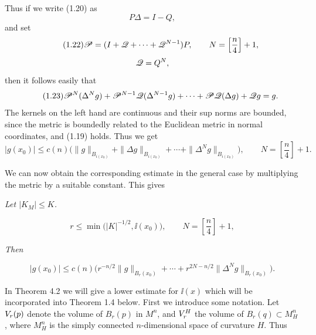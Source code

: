 Thus if we write (1.20) as
\begin{equation}\tag{1.21}
 P\Delta = I - Q,
\end{equation}
and set
\begin{equation}\tag{1.22}
 \mathscr{P} = (I + \mathscr{Q} + \cdots + \mathscr{Q}^{N-1})P,\qquad
 N=\left[\frac{n}{4}\right]+1,
\end{equation}
\[
\mathscr{Q} = Q^N,
\]
then it follows easily that
\begin{equation}\tag{1.23}
 \mathscr{P}^N(\Delta^N g) + \mathscr{P}^{N-1}\mathscr{Q}(\Delta^{N-1}g) + \cdots + \mathscr{P}\mathscr{Q}(\Delta g) + \mathscr{Q} g = g.
\end{equation}
The kernels on the left hand are continuous and their sup norms are bounded,
since the metric is boundedly related to the Euclidean metric in normal
coordinates, and (1.19) holds. Thus we get
\begin{equation}\tag{1.24}
|g(x_0)| \leq c(n)\bigl(\|g\|_{B_{i(x_0)}} + \|\Delta g\|_{B_{i(x_0)}} + \cdots + \|\Delta^N g\|_{B_{i(x_0)}}\bigr),
\qquad
N=\left[\frac{n}{4}\right]+1.
\end{equation}

We can now obtain the corresponding estimate in the general case by
multiplying the metric by a suitable constant. This gives

\begin{proposition}
\label{prop:local-elliptic-estimate}
\textit{Let $\lvert K_M\rvert \leq K$.}

\begin{equation}\tag{1.25}
r \leq \min\bigl(|K|^{-1/2}, \ii(x_0)\bigr),\qquad
N=\left[\frac{n}{4}\right]+1,
\end{equation}

\textit{Then}

\begin{equation}\tag{1.26}
|g(x_0)| \leq c(n)\bigl(r^{-n/2}\|g\|_{B_r(x_0)} + \cdots + r^{2N-n/2}\|\Delta^N g\|_{B_r(x_0)}\bigr).
\end{equation}
\end{proposition}

In Theorem 4.2 we will give a lower estimate for $\ii(x)$ which will be
incorporated into Theorem 1.4 below. First we introduce some notation.
Let $V_r(p)$ denote the volume of $B_r(p)$ in $M^n$, and $V_r^{H}$ the volume of
$B_r(q)\subset M_H^n$, where $M_H^n$ is the simply connected $n$-dimensional
space of curvature $H$. Thus

